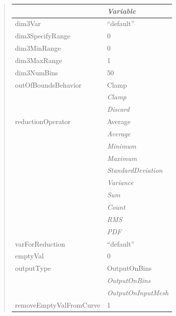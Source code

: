 \documentclass[letterpaper,10pt,english]{sphinxmanual}
\begin{document}
\begin{quote}
\begin{longtable}{|l|l|}
\hline & 
\emph{Variable}
\\
\hline
dim3Var
 & 
``default''
\\
\hline
dim3SpecifyRange
 & 
0
\\
\hline
dim3MinRange
 & 
0
\\
\hline
dim3MaxRange
 & 
1
\\
\hline
dim3NumBins
 & 
50
\\
\hline
outOfBoundsBehavior
 & 
Clamp
\\
\hline & 
\emph{Clamp}
\\
\hline & 
\emph{Discard}
\\
\hline
reductionOperator
 & 
Average
\\
\hline & 
\emph{Average}
\\
\hline & 
\emph{Minimum}
\\
\hline & 
\emph{Maximum}
\\
\hline & 
\emph{StandardDeviation}
\\
\hline & 
\emph{Variance}
\\
\hline & 
\emph{Sum}
\\
\hline & 
\emph{Count}
\\
\hline & 
\emph{RMS}
\\
\hline & 
\emph{PDF}
\\
\hline
varForReduction
 & 
``default''
\\
\hline
emptyVal
 & 
0
\\
\hline
outputType
 & 
OutputOnBins
\\
\hline & 
\emph{OutputOnBins}
\\
\hline & 
\emph{OutputOnInputMesh}
\\
\hline
removeEmptyValFromCurve
 & 
1
\\
\hline\end{longtable}

\end{quote}

\begin{DUlineblock}{0em}
\item[] 
\end{DUlineblock}

\begin{DUlineblock}{0em}
\item[] 
\end{DUlineblock}
\end{document}
